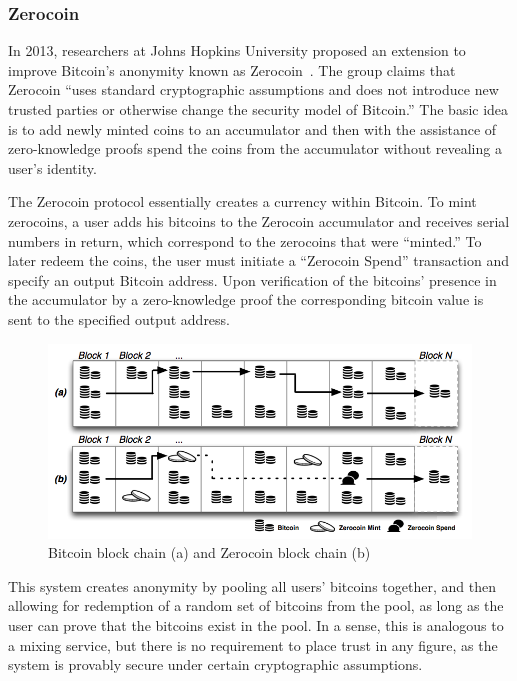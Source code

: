 \documentclass[11pt]{article}
\begin{document}
\subsubsection{Zerocoin} In 2013, researchers at Johns Hopkins University proposed an extension to improve Bitcoin's
anonymity known as Zerocoin~\cite{miers13}. The group claims that Zerocoin ``uses standard cryptographic assumptions and
does not introduce new trusted parties or otherwise change the security model of Bitcoin.'' The basic idea is to add
newly minted coins to an accumulator and then with the assistance of zero-knowledge proofs spend the coins from the
accumulator without revealing a user's identity.

The Zerocoin protocol essentially creates a currency within Bitcoin. To mint zerocoins, a user adds his bitcoins to the
Zerocoin accumulator and receives serial numbers in return, which correspond to the zerocoins that were ``minted.'' To
later redeem the coins, the user must initiate a ``Zerocoin Spend'' transaction and specify an output Bitcoin address.
Upon verification of the bitcoins' presence in the accumulator by a zero-knowledge proof the corresponding bitcoin value
is sent to the specified output address.

\begin{figure}[H] \centering \caption[Bitcoin block chain (a) and Zerocoin block chain (b)]{Bitcoin block chain (a) and
Zerocoin block chain (b)~\cite{miers13}} \includegraphics[width=\linewidth]{figures/zerocoin.png} \end{figure}

This system creates anonymity by pooling all users' bitcoins together, and then allowing for redemption of a random set
of bitcoins from the pool, as long as the user can prove that the bitcoins exist in the pool. In a sense, this is
analogous to a mixing service, but there is no requirement to place trust in any figure, as the system is provably
secure under certain cryptographic assumptions.
\end{document}
